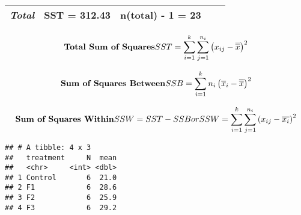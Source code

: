 \documentclass[]{book}
\newenvironment{Shaded}{\begin{snugshade}}{\end{snugshade}}
\newcommand{\CommentTok}[1]{\textcolor[rgb]{0.56,0.35,0.01}{\textit{#1}}}
\newcommand{\DataTypeTok}[1]{\textcolor[rgb]{0.13,0.29,0.53}{#1}}
\newcommand{\KeywordTok}[1]{\textcolor[rgb]{0.13,0.29,0.53}{\textbf{#1}}}
\newcommand{\NormalTok}[1]{#1}
\newcommand{\OperatorTok}[1]{\textcolor[rgb]{0.81,0.36,0.00}{\textbf{#1}}}
\newcommand{\StringTok}[1]{\textcolor[rgb]{0.31,0.60,0.02}{#1}}
\theoremstyle{definition}
\theoremstyle{definition}
\theoremstyle{definition}
\theoremstyle{remark}
\begin{document}
\begin{longtable}[]{@{}lcccc@{}}
\begin{minipage}[t]{0.19\columnwidth}
\emph{Total}\strut
\end{minipage} & \begin{minipage}[t]{0.19\columnwidth}\centering
SST = 312.43\strut
\end{minipage} & \begin{minipage}[t]{0.22\columnwidth}\centering
n(total) - 1 = 23\strut
\end{minipage} & \begin{minipage}[t]{0.17\columnwidth}\centering
\strut
\end{minipage} & \begin{minipage}[t]{0.08\columnwidth}\centering
\strut
\end{minipage}\tabularnewline
\bottomrule
\end{longtable}

\[
\textbf{Total Sum of Squares} \\ 
~ \\
SST = \sum_{i=1}^k \sum_{j=1}^{n_i} \left ( x_{ij} - \overline{\overline{x}} \right )^2
\]

\[
\textbf{Sum of Squares Between} \\ 
~ \\
SSB = \sum_{i = 1}^k{n_i \left (\overline{x}_i - \overline{\overline{x}}  \right )^2}
\]

\[
\textbf{Sum of Squares Within} \\  
~ \\
SSW = SST - SSB  \\  
or \\  
SSW = \sum_{i=1}^k \sum_{j=1}^{n_i} \left ( x_{ij} - \overline{x_i} \right)^2
\]

\begin{Shaded}
\end{Shaded}

\begin{verbatim}
## # A tibble: 4 x 3
##   treatment     N  mean
##   <chr>     <int> <dbl>
## 1 Control       6  21.0
## 2 F1            6  28.6
## 3 F2            6  25.9
## 4 F3            6  29.2
\end{verbatim}
\end{document}
